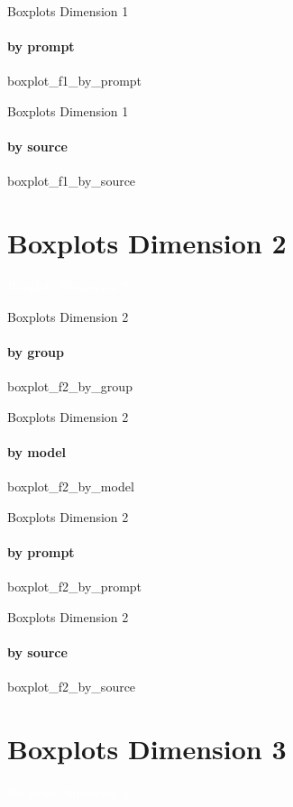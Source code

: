 {\nologo
\begin{frame}{Boxplots Dimension 1}
    \framesubtitle{by prompt}
    {boxplot_f1_by_prompt}
\end{frame}
}

{\nologo
\begin{frame}{Boxplots Dimension 1}
    \framesubtitle{by source}
    {boxplot_f1_by_source}
\end{frame}
}

\section{Boxplots Dimension 2}

{\nologo
{}
\begin{frame}[c,plain]{}
    \vspace*{1cm}
    \centering
    \Huge
    \textcolor{white}{Boxplots Dimension 2}
\end{frame}
}

{\nologo
\begin{frame}{Boxplots Dimension 2}
    \framesubtitle{by group}
    {boxplot_f2_by_group}
\end{frame}
}

{\nologo
\begin{frame}{Boxplots Dimension 2}
    \framesubtitle{by model}
    {boxplot_f2_by_model}
\end{frame}
}

{\nologo
\begin{frame}{Boxplots Dimension 2}
    \framesubtitle{by prompt}
    {boxplot_f2_by_prompt}
\end{frame}
}

{\nologo
\begin{frame}{Boxplots Dimension 2}
    \framesubtitle{by source}
    {boxplot_f2_by_source}
\end{frame}
}

\section{Boxplots Dimension 3}

{\nologo
{}
\begin{frame}[c,plain]{}
    \vspace*{1cm}
    \centering
    \Huge
    \textcolor{white}{Boxplots Dimension 3}
\end{frame}
}

